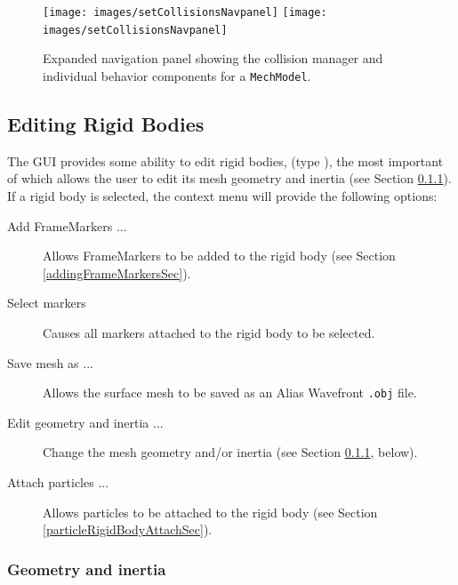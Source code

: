 \documentclass{article}
\begin{document}
\begin{figure}[h]
\begin{center}
\iflatexml
\texttt{[image: images/setCollisionsNavpanel]}
\else
\texttt{[image: images/setCollisionsNavpanel]}
\fi
\end{center}
\caption{Expanded navigation panel showing the collision manager and
individual behavior components for a {\tt MechModel}.}
\label{setCollisionsNavpanel:fig}
\end{figure}

\subsection{Editing Rigid Bodies}

The GUI provides some ability to edit rigid bodies,
(type ), 
the most important
of which allows the user to edit its mesh geometry and inertia (see
Section \ref{geometryAndInertiaSec}).  If a rigid body is selected, the context
menu will provide the following options:

\begin{description}

\item[Add FrameMarkers ...]\mbox{}

Allows FrameMarkers to be added to the rigid body 
(see Section \ref{addingFrameMarkersSec}).

\item[Select markers]\mbox{}

Causes all markers attached to the rigid body to be selected.

\item[Save mesh as ...]\mbox{}

Allows the surface mesh to be saved as an Alias Wavefront {\tt .obj} file.

\item[Edit geometry and inertia ...]\mbox{}

Change the mesh geometry and/or inertia 
(see Section \ref{geometryAndInertiaSec}, below).

\item[Attach particles ...]\mbox{}

Allows particles to be attached to the rigid body 
(see Section \ref{particleRigidBodyAttachSec}).

\end{description}

\subsubsection{Geometry and inertia}
\label{geometryAndInertiaSec}
\end{document}
